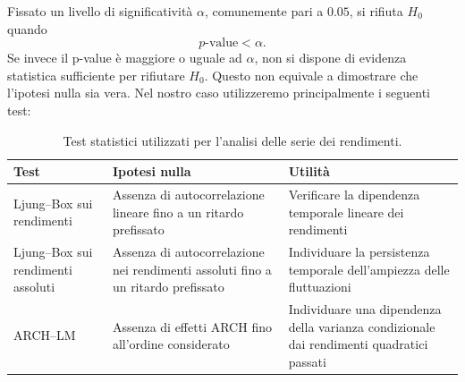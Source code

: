 \begin{itemize}
    Fissato un livello di significatività $\alpha$, comunemente pari a $0.05$, si rifiuta $H_0$ quando
    \[
    p\text{-value}<\alpha.
    \]
    Se invece il p-value è maggiore o uguale ad $\alpha$, non si dispone di evidenza statistica sufficiente per rifiutare $H_0$.
    Questo non equivale a dimostrare che l'ipotesi nulla sia vera.
    Nel nostro caso utilizzeremo principalmente i seguenti test:
    \begin{table}[htbp]
        \centering
        \small
        \renewcommand{\arraystretch}{1.4}
        \begin{tabularx}{\textwidth}{X X X}
            \toprule
            \textbf{Test}
            & \textbf{Ipotesi nulla}
            & \textbf{Utilità} \\
            \midrule
            Ljung--Box sui rendimenti
            & Assenza di autocorrelazione lineare fino a un ritardo prefissato
            & Verificare la dipendenza temporale lineare dei rendimenti \\
            Ljung--Box sui rendimenti assoluti
            & Assenza di autocorrelazione nei rendimenti assoluti fino a un ritardo prefissato
            & Individuare la persistenza temporale dell'ampiezza delle fluttuazioni \\
            ARCH--LM
            & Assenza di effetti ARCH fino all'ordine considerato
            & Individuare una dipendenza della varianza condizionale dai rendimenti quadratici passati \\
            \bottomrule
        \end{tabularx}
        \caption{Test statistici utilizzati per l'analisi delle serie dei rendimenti.}
        \label{tab:test-statistici-rendimenti}
    \end{table}


\end{itemize}
